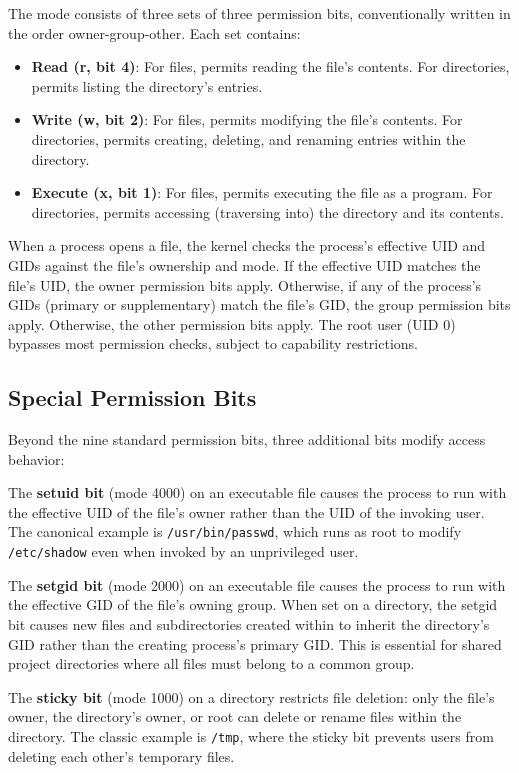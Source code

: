 The mode consists of three sets of three permission bits, conventionally written in the order owner-group-other. Each set contains:

\begin{itemize}
  \item \textbf{Read (r, bit 4)}: For files, permits reading the file's contents. For directories, permits listing the directory's entries.
  \item \textbf{Write (w, bit 2)}: For files, permits modifying the file's contents. For directories, permits creating, deleting, and renaming entries within the directory.
  \item \textbf{Execute (x, bit 1)}: For files, permits executing the file as a program. For directories, permits accessing (traversing into) the directory and its contents.
\end{itemize}

When a process opens a file, the kernel checks the process's effective UID and GIDs against the file's ownership and mode. If the effective UID matches the file's UID, the owner permission bits apply. Otherwise, if any of the process's GIDs (primary or supplementary) match the file's GID, the group permission bits apply. Otherwise, the other permission bits apply. The root user (UID 0) bypasses most permission checks, subject to capability restrictions.

\subsection{Special Permission Bits}

Beyond the nine standard permission bits, three additional bits modify access behavior:

The \textbf{setuid bit} (mode 4000) on an executable file causes the process to run with the effective UID of the file's owner rather than the UID of the invoking user. The canonical example is \texttt{/usr/bin/passwd}, which runs as root to modify \texttt{/etc/shadow} even when invoked by an unprivileged user.

The \textbf{setgid bit} (mode 2000) on an executable file causes the process to run with the effective GID of the file's owning group. When set on a directory, the setgid bit causes new files and subdirectories created within to inherit the directory's GID rather than the creating process's primary GID. This is essential for shared project directories where all files must belong to a common group.

The \textbf{sticky bit} (mode 1000) on a directory restricts file deletion: only the file's owner, the directory's owner, or root can delete or rename files within the directory. The classic example is \texttt{/tmp}, where the sticky bit prevents users from deleting each other's temporary files.

